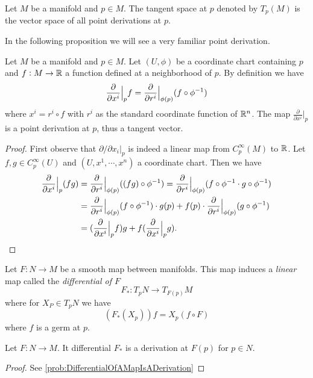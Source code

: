 \begin{definition}
	Let $ M $ be a manifold and $ p \in M $. The tangent space at $ p $ denoted by $ T_p(M) $ is the vector space of all point derivations at $ p $.
\end{definition}
In the following proposition we will see a very familiar point derivation.
\begin{proposition}
	Let $ M $ be a manifold and $ p \in M $. Let $ (U,\phi) $ be a coordinate chart containing $ p $ and $ f:M \to \mathbb{R} $ a function defined at a neighborhood of $ p $. By definition we have
	\[ \frac{\partial }{\partial x^i}\big|_p f = \frac{\partial}{\partial r^i}\big|_{\phi(p)} (f\circ\phi^{-1}) \]
	where $ x^i = r^i \circ f $ with $ r^i $ as the standard coordinate function of $ \mathbb{R}^n $. The map $ \frac{\partial}{\partial x^i}\big|_{p} $ is a point derivation at $ p $, thus a tangent vector.
\end{proposition}
\begin{proof}
	First observe that $ \partial/\partial x_i|_p $ is indeed a linear map from $ C_p^\infty(M) $ to $ \mathbb{R} $. Let $ f,g \in C_p^\infty(U) $ and $ (U,x^1,\cdots,x^n) $ a coordinate chart. Then we have
	\begin{align*}
		\frac{\partial}{\partial x^i}\big|_p (fg) &=  \frac{\partial}{\partial  r^i}\big|_{\phi(p)}((fg)\circ \phi^{-1} ) = \frac{\partial}{\partial  r^i}\big|_{\phi(p)}(f\circ\phi^{-1} \cdot g\circ\phi^{-1}) \\
		&= \frac{\partial}{\partial  r^i}\big|_{\phi(p)}(f\circ\phi^{-1})\cdot g(p) + f(p)\cdot \frac{\partial}{\partial  r^i}\big|_{\phi(p)} (g\circ\phi^{-1})\\
		&=(\frac{\partial}{\partial  x^i}\big|_{p}f ) g + f(\frac{\partial}{\partial  x^i}\big|_{p} g).
	\end{align*}
\end{proof}

\begin{definition}
	Let $ F:N\to M $ be a smooth map between manifolds. This map induces a \emph{linear} map  called the \emph{differential of $ F $}
	\[ F_*: T_p N \to T_{F(p)}M \]
	where for $ X_P \in T_p N $ we have
	\[ (F_*(X_p))f = X_p(f\circ F) \]
	where $ f $ is a germ at $ p $.
\end{definition}

\begin{proposition}
	Let $ F:N\to M $. It differential $ F_* $ is a derivation at $ F(p) $ for $ p \in N $. 
\end{proposition}
\begin{proof}
	See \autoref{prob:DifferentialOfAMapIsADerivation}
\end{proof}

